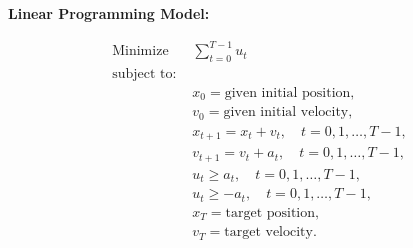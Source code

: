 \documentclass{article}
\begin{document}
\textbf{Linear Programming Model:}

\begin{align*}
\text{Minimize } & \sum_{t=0}^{T-1} u_t \\
\text{subject to: } \\
& x_0 = \text{given initial position,} \\
& v_0 = \text{given initial velocity,} \\
& x_{t+1} = x_t + v_t, \quad t = 0, 1, \ldots, T-1, \\
& v_{t+1} = v_t + a_t, \quad t = 0, 1, \ldots, T-1, \\
& u_t \geq a_t, \quad t = 0, 1, \ldots, T-1, \\
& u_t \geq -a_t, \quad t = 0, 1, \ldots, T-1, \\
& x_T = \text{target position,} \\
& v_T = \text{target velocity.}
\end{align*}
\end{document}
